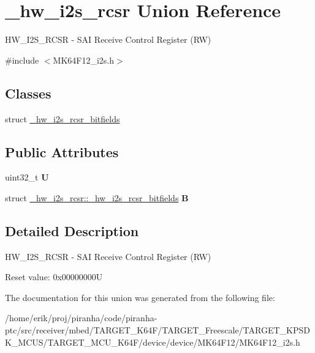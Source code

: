 \hypertarget{union__hw__i2s__rcsr}{}\section{\+\_\+hw\+\_\+i2s\+\_\+rcsr Union Reference}
\label{union__hw__i2s__rcsr}


H\+W\+\_\+\+I2\+S\+\_\+\+R\+C\+SR -\/ S\+AI Receive Control Register (RW)  




{\ttfamily \#include $<$M\+K64\+F12\+\_\+i2s.\+h$>$}

\subsection*{Classes}
\begin{DoxyCompactItemize}
\item 
struct \hyperlink{struct__hw__i2s__rcsr_1_1__hw__i2s__rcsr__bitfields}{\+\_\+hw\+\_\+i2s\+\_\+rcsr\+\_\+bitfields}
\end{DoxyCompactItemize}
\subsection*{Public Attributes}
\begin{DoxyCompactItemize}
\item 
uint32\+\_\+t {\bfseries U}\hypertarget{union__hw__i2s__rcsr_a104a339e5bfa831c5aacc582a3b73df9}{}\label{union__hw__i2s__rcsr_a104a339e5bfa831c5aacc582a3b73df9}

\item 
struct \hyperlink{struct__hw__i2s__rcsr_1_1__hw__i2s__rcsr__bitfields}{\+\_\+hw\+\_\+i2s\+\_\+rcsr\+::\+\_\+hw\+\_\+i2s\+\_\+rcsr\+\_\+bitfields} {\bfseries B}\hypertarget{union__hw__i2s__rcsr_adfa8ac1da1e9834d0abd64162633d30a}{}\label{union__hw__i2s__rcsr_adfa8ac1da1e9834d0abd64162633d30a}

\end{DoxyCompactItemize}


\subsection{Detailed Description}
H\+W\+\_\+\+I2\+S\+\_\+\+R\+C\+SR -\/ S\+AI Receive Control Register (RW) 

Reset value\+: 0x00000000U 

The documentation for this union was generated from the following file\+:\begin{DoxyCompactItemize}
\item 
/home/erik/proj/piranha/code/piranha-\/ptc/src/receiver/mbed/\+T\+A\+R\+G\+E\+T\+\_\+\+K64\+F/\+T\+A\+R\+G\+E\+T\+\_\+\+Freescale/\+T\+A\+R\+G\+E\+T\+\_\+\+K\+P\+S\+D\+K\+\_\+\+M\+C\+U\+S/\+T\+A\+R\+G\+E\+T\+\_\+\+M\+C\+U\+\_\+\+K64\+F/device/device/\+M\+K64\+F12/M\+K64\+F12\+\_\+i2s.\+h\end{DoxyCompactItemize}
